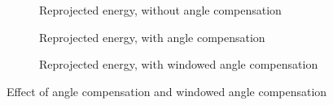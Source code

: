 \begin{figure}[htbp]
    \centering
    \begin{subfigure}{\textwidth}
        \centering
        \def\svgscale{0.8} \small
        
        \caption{Reprojected energy, without angle compensation}
        \label{fig:fig_angle_compensation_comparison_1}
        \bigskip
    \end{subfigure}
    \begin{subfigure}{\textwidth}
        \centering
        \def\svgscale{0.8} \small
        
        \caption{Reprojected energy, with angle compensation}
        \label{fig:fig_angle_compensation_comparison_2}
        \bigskip
    \end{subfigure}
    \begin{subfigure}{\textwidth}
        \centering
        \def\svgscale{0.8} \small
        
        \caption{Reprojected energy, with windowed angle compensation}
        \label{fig:fig_angle_compensation_comparison_3}
        \bigskip
    \end{subfigure}
    \caption{Effect of angle compensation and windowed angle compensation}
    \label{fig:fig_angle_compensation_comparison}
\end{figure}

